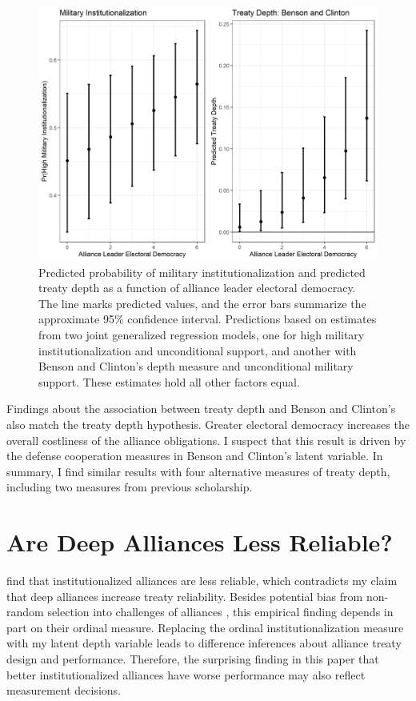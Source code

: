 \documentclass[12pt]{article}
\begin{document}
\begin{figure}
\includegraphics[width=.95\textwidth]{results-alt-measures.png}  
\caption{Predicted probability of military institutionalization and predicted treaty depth as a function of alliance leader electoral democracy. The line marks predicted values, and the error bars summarize the approximate 95\% confidence interval. Predictions based on estimates from two joint generalized regression models, one for high military institutionalization and unconditional support, and another with Benson and Clinton's depth measure and unconditional military support. These estimates hold all other factors equal.}
\label{fig:results-alt-measures}
\end{figure}


Findings about the association between treaty depth and Benson and Clinton's also match the treaty depth hypothesis. 
Greater electoral democracy increases the overall costliness of the alliance obligations. 
I suspect that this result is driven by the defense cooperation measures in Benson and Clinton's latent variable. 
In summary, I find similar results with four alternative measures of treaty depth, including two measures from previous scholarship. 




\section{Are Deep Alliances Less Reliable?} 


\citet{LeedsAnac2005} find that institutionalized alliances are less reliable, which contradicts my claim that deep alliances increase treaty reliability. 
Besides potential bias from non-random selection into challenges of alliances \citep{Smith1995}, this empirical finding depends in part on their ordinal measure. 
Replacing the ordinal institutionalization measure with my latent depth variable leads to difference inferences about alliance treaty design and performance. 
Therefore, the surprising finding in this paper that better institutionalized alliances have worse performance may also reflect measurement decisions. 
\end{document}
